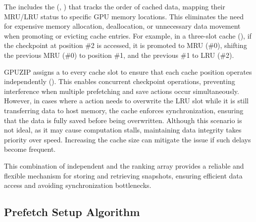 \documentclass[Ingles]{ic-tese-v3}
\begin{document}
The \cache includes the  (, ) that tracks the order of cached \checkpointing data, mapping their MRU/LRU status to specific GPU memory locations. This eliminates the need for expensive memory allocation, deallocation, or unnecessary data movement when promoting or evicting cache entries. For example, in a three-slot cache (), if the checkpoint at position \#2 is accessed, it is promoted to MRU (\#0), shifting the previous MRU (\#0) to position \#1, and the previous \#1 to LRU (\#2).

GPUZIP assigns a  to every cache slot to ensure that each cache position operates independently (). This enables concurrent checkpoint operations, preventing interference when multiple prefetching and save actions occur simultaneously. However, in cases where a \save action needs to overwrite the LRU slot while it is still transferring data to host memory, the cache enforces synchronization, ensuring that the data is fully saved before being overwritten. Although this scenario is not ideal, as it may cause computation stalls, maintaining data integrity takes priority over speed. Increasing the cache size can mitigate the issue if such delays become frequent.

This combination of independent  and the ranking array provides a reliable and flexible mechanism for storing and retrieving snapshots, ensuring efficient data access and avoiding synchronization bottlenecks.


\subsection{Prefetch Setup Algorithm}
\label{sec:psa}

\end{document}
